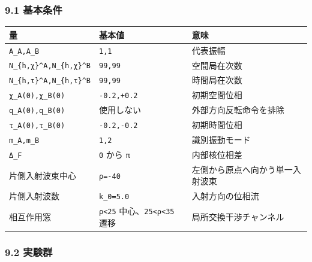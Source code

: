 \documentclass[
  a4paper,
]{article}
\newcounter{none} %
\begin{document}
\subsubsection{9.1 基本条件}\label{ux57faux672cux6761ux4ef6}

{\def\LTcaptype{none} %
\begin{longtable}[]{@{}
  >{\raggedright\arraybackslash}p{}
  >{\raggedleft\arraybackslash}p{}
  >{\raggedright\arraybackslash}p{}@{}}
\toprule\noalign{}
\begin{minipage}[b]{\linewidth}\raggedright
量
\end{minipage} & \begin{minipage}[b]{\linewidth}\raggedleft
基本値
\end{minipage} & \begin{minipage}[b]{\linewidth}\raggedright
意味
\end{minipage} \\
\midrule\noalign{}
\endhead
\bottomrule\noalign{}
\endlastfoot
\texttt{A\_A,A\_B} & \texttt{1,1} & 代表振幅 \\
\texttt{N\_\{h,χ\}\^{}A,N\_\{h,χ\}\^{}B} & \texttt{99,99} &
空間局在次数 \\
\texttt{N\_\{h,τ\}\^{}A,N\_\{h,τ\}\^{}B} & \texttt{99,99} &
時間局在次数 \\
\texttt{χ\_A(0),χ\_B(0)} & \texttt{-0.2,+0.2} & 初期空間位相 \\
\texttt{q\_A(0),q\_B(0)} & 使用しない & 外部方向反転命令を排除 \\
\texttt{τ\_A(0),τ\_B(0)} & \texttt{-0.2,-0.2} & 初期時間位相 \\
\texttt{m\_A,m\_B} & \texttt{1,2} & 識別振動モード \\
\texttt{Δ\_F} & \texttt{0} から \texttt{π} & 内部核位相差 \\
片側入射波束中心 & \texttt{ρ=-40} & 左側から原点へ向かう単一入射波束 \\
片側入射波数 & \texttt{k\_0=5.0} & 入射方向の位相流 \\
相互作用窓 & \texttt{\textbar{}ρ\textbar{}\textless{}25}
中心、\texttt{25\textless{}\textbar{}ρ\textbar{}\textless{}35} 遷移 &
局所交換干渉チャンネル \\
\end{longtable}
}

\subsubsection{9.2 実験群}\label{ux5b9fux9a13ux7fa4}
\end{document}
